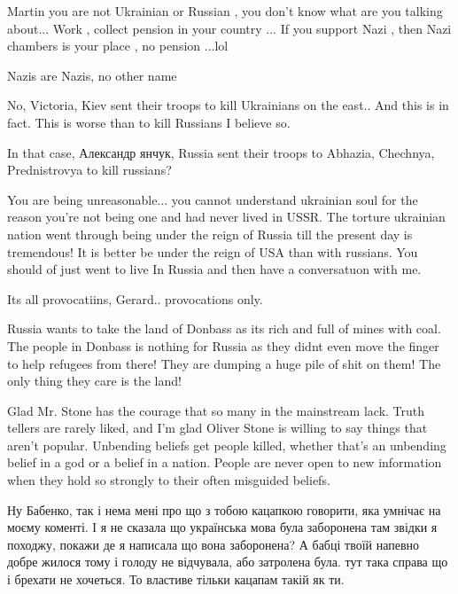 \begin{itemize}
\begin{itemize}

Martin you are not Ukrainian or Russian , you don't know what are you talking
about... Work , collect pension in your country ... If you support Nazi , then
Nazi chambers is your place , no pension ...lol

Nazis are Nazis, no other name

No, Victoria, Kiev sent their troops to kill Ukrainians on the east.. And this is in fact. This is worse than to kill Russians I believe so.

In that case, Александр янчук, Russia sent their troops to Abhazia, Chechnya, Prednistrovya to kill russians?


You are being unreasonable... you cannot understand ukrainian soul for the
reason you're not being one and had never lived in USSR. The torture ukrainian
nation went through being under the reign of Russia till the present day is
tremendous! It is better be under the reign of USA than with russians. You
should of just went to live In Russia and then have a conversatuon with me.

Its all provocatiins, Gerard.. provocations only.


Russia wants to take the land of Donbass as its rich and full of mines with
coal. The people in Donbass is nothing for Russia as they didnt even move the
finger to help refugees from there! They are dumping a huge pile of shit on
them! The only thing they care is the land!


Glad Mr. Stone has the courage that so many in the mainstream lack. Truth
tellers are rarely liked, and I'm glad Oliver Stone is willing to say things
that aren't popular. Unbending beliefs get people killed, whether that's an
unbending belief in a god or a belief in a nation. People are never open to new
information when they hold so strongly to their often misguided beliefs.


Ну Бабенко, так і нема мені про що з тобою кацапкою говорити, яка умнічає на
моєму коменті. І я не сказала що українська мова була заборонена там звідки я
походжу, покажи де я написала що вона заборонена? А бабці твоїй напевно добре
жилося тому і голоду не відчувала, або затролена була. тут така справа що і
брехати не хочеться. То властиве тільки кацапам такій як ти.



\end{itemize}
\end{itemize}
